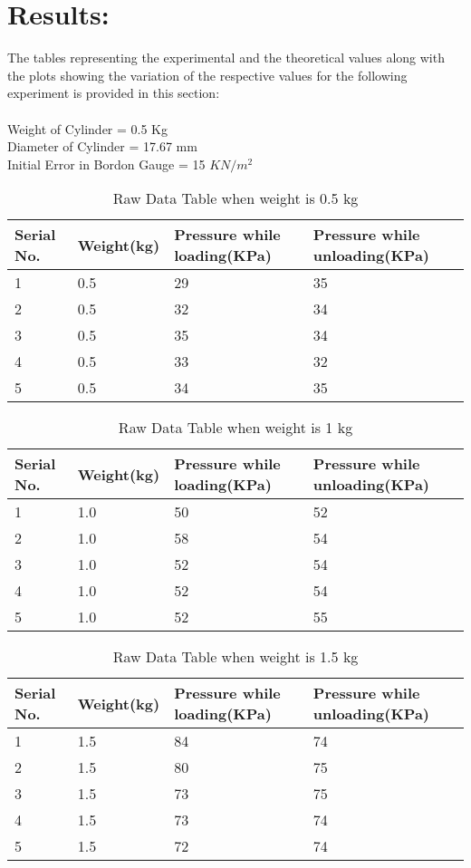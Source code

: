 \documentclass[12pt,a4paper]{article}
\begin{document}
\section{Results:}
The tables representing the experimental and the theoretical values along with the plots showing the variation of the respective values for the following experiment is provided in this section:\\
\\Weight of Cylinder = 0.5 Kg\\
Diameter of Cylinder = 17.67 mm\\
Initial Error in Bordon Gauge = 15 $KN/m^2$\\
\begin{table}[!ht]
\begin{center}
\begin{tabular}{|p{2cm}|p{2cm}|p{6cm}|p{6cm}|}
\hline
Serial No. & Weight(kg) & Pressure while loading(KPa) & Pressure while unloading(KPa) \\
\hline
1 & 0.5 & 29 & 35\\
2 & 0.5 & 32 & 34\\
3 & 0.5 & 35 & 34\\
4 & 0.5 & 33 & 32\\
5 & 0.5 & 34 & 35\\
\hline
\end{tabular}
\caption{Raw Data Table when weight is 0.5 kg}
\end{center}
\end{table}
\begin{table}[!ht]
\begin{center}
\begin{tabular}{|p{2cm}|p{2cm}|p{6cm}|p{6cm}|}
\hline
Serial No. & Weight(kg) & Pressure while loading(KPa) & Pressure while unloading(KPa) \\
\hline
1 & 1.0 & 50 & 52\\
2 & 1.0 & 58 & 54\\
3 & 1.0 & 52 & 54\\
4 & 1.0 & 52 & 54\\
5 & 1.0 & 52 & 55\\
\hline
\end{tabular}
\caption{Raw Data Table when weight is 1 kg}
\end{center}
\end{table}
\begin{table}[!ht]
\begin{center}
\begin{tabular}{|p{2cm}|p{2cm}|p{6cm}|p{6cm}|}
\hline
Serial No. & Weight(kg) & Pressure while loading(KPa) & Pressure while unloading(KPa) \\
\hline
1 & 1.5 & 84 & 74\\
2 & 1.5 & 80 & 75\\
3 & 1.5 & 73 & 75\\
4 & 1.5 & 73 & 74\\
5 & 1.5 & 72 & 74\\
\hline
\end{tabular}
\caption{Raw Data Table when weight is 1.5 kg}
\end{center}
\end{table}
\end{document}
